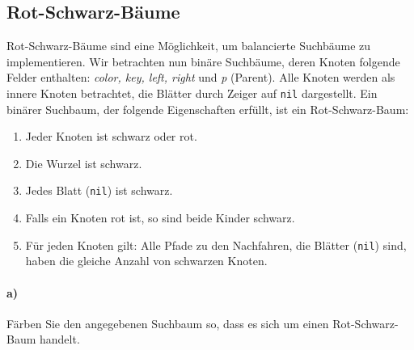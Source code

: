 \documentclass[paper=a4, fontsize=11pt]{scrartcl}
\numberwithin{equation}{section}
\numberwithin{figure}{section}
\numberwithin{table}{section}
\begin{document}
\subsection{Rot-Schwarz-Bäume}
Rot-Schwarz-Bäume sind eine Möglichkeit, um balancierte Suchbäume zu implementieren. Wir betrachten nun binäre Suchbäume, deren Knoten folgende Felder enthalten: {\em color, key, left, right} und {\em p} (Parent). Alle Knoten werden als innere Knoten betrachtet, die Blätter durch Zeiger auf \texttt{nil} dargestellt. 
Ein binärer Suchbaum, der folgende Eigenschaften erfüllt, ist ein Rot-Schwarz-Baum:
\begin{enumerate}
\item Jeder Knoten ist schwarz oder rot.
\item Die Wurzel ist schwarz.
\item Jedes Blatt (\texttt{nil}) ist schwarz.
\item Falls ein Knoten rot ist, so sind beide Kinder schwarz.
\item Für jeden Knoten gilt: Alle Pfade zu den Nachfahren, die Blätter (\texttt{nil}) sind, haben die gleiche Anzahl von schwarzen Knoten.
\end{enumerate}

\paragraph{a)} 
Färben Sie den angegebenen Suchbaum so, dass es sich um einen Rot-Schwarz-Baum handelt. \\
\end{document}
